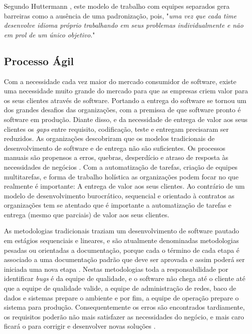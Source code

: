 Segundo Huttermann \cite{huttermann2012}, este modelo de trabalho com equipes separados gera barreiras como a ausência de uma padronização, pois, "\textit{uma vez que cada time desenvolve idioma próprio trabalhando em seus problemas individualmente e não em prol de um único objetivo.}" 

\subsection{Processo Ágil}

Com a necessidade cada vez maior do mercado consumidor de software, existe uma necessidade muito grande do mercado para que as empresas criem valor para os seus clientes através de software. Portando a entrega do software se tornou um dos grandes desafios das organizações, com a premissa de que software pronto é software em produção. Diante disso, e da necessidade de entrega de valor aos seus clientes os \textit{gaps} entre requisito, codificação, teste e entregam precisaram ser reduzidos. As organizações descobriram que os modelos tradicionais de desenvolvimento de software e de entrega não são suficientes. Os processos manuais são propensos a erros, quebras, desperdício e atraso de resposta às necessidades de negócios \cite{BRAGA2015}. Com a automatização de tarefas, criação de equipes multitarefas, e forma de trabalho holística as organizações podem focar no que realmente é importante: A entrega de valor aos seus clientes. Ao contrário de um modelo de desenvolvimento burocrático, sequencial e orientado à contratos as organizações tem se atentado que é importante a automatização de tarefas e entrega (mesmo que parciais) de valor aos seus clientes.

As metodologias tradicionais traziam um desenvolvimento de software pautado em estágios sequenciais e lineares, e são atualmente denominadas metodologias pesadas ou orientadas a documentação, porque cada o término de cada etapa é associado a uma documentação padrão que deve ser aprovada e assim poderá ser iniciada uma nova etapa \cite{ROYCE1970}. Nestas metodologias toda a responsabilidade por identificar \textit{bugs} é da equipe de qualidade, e o software não chega até o cliente até que a equipe de qualidade valide, a equipe de administração de redes, baco de dados e sistemas prepare o ambiente e por fim, a equipe de operação prepare o sistema para produção. Consequentemente os erros são encontrados tardiamente, os requisitos poderão não mais satisfazer as necessidades do negócio, e mais caro ficará o para corrigir e desenvolver novas soluções \cite{PRESSMAN2011}.

